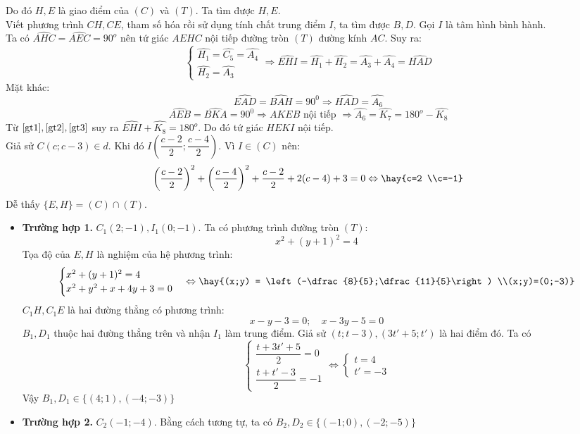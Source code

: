 Do đó $H,E$ là giao điểm của $(C)$ và $(T)$. Ta tìm được $H,E$.\\
Viết phương trình $CH, CE$, tham số hóa rồi sử dụng tính chất trung điểm $I$, ta tìm được $B,D$.
\lgi
Gọi $I$ là tâm hình bình hành. \\
Ta có $\widehat{AHC}=\widehat{AEC}=90^o$ nên tứ giác $AEHC$ nội tiếp đường tròn $(T)$ đường kính $AC$. Suy ra:
\begin{equation} \label{gt1}
 \begin{cases} \widehat{H_1} = \widehat{C_5}= \widehat{A_4} \\ \widehat{H_2}=\widehat{A_3}  \end{cases} \Rightarrow \widehat{EHI} = \widehat{H_1}+\widehat{H_2} = \widehat{A_3}+\widehat{A_4} =\widehat{HAD}
\end{equation}
Mặt khác:
\begin{equation} \label{gt2}
\widehat{EAD} = \widehat{BAH} = 90^0  \Rightarrow \widehat{HAD} = \widehat{A_6}
\end{equation}
\begin{equation} \label{gt3}
\widehat{AEB} = \widehat{BKA} = 90^0  \Rightarrow AKEB \text{ nội tiếp } \Rightarrow \widehat{A_6}=\widehat{K_7} = 180^o-\widehat{K_8}
\end{equation}
Từ $\eqref{gt1}, \eqref{gt2}, \eqref{gt3}$ suy ra $\widehat{EHI}+\widehat{K_8}=180^o$. Do đó tứ giác $HEKI$ nội tiếp.\\
Giả sử $C(c;c-3) \in d$. Khi đó $I\left(\dfrac{c-2}{2};\dfrac{c-4}{2}\right)$. Vì $I \in (C)$ nên:
$$\left(\dfrac{c-2}{2}\right)^2+ \left(\dfrac{c-4}{2}\right)^2+\dfrac{c-2}{2}+2(c-4)+3=0 \Leftrightarrow \hay{c=2 \\c=-1}$$
Dễ thấy $\{ E, H \} = (C) \cap (T)$.
\begin{itemize}
\item \textbf{Trường hợp 1.} $C_1(2;-1), I_1(0;-1)$. Ta có phương trình đường tròn $(T):$
$$x^2+(y+1)^2 = 4$$
Tọa độ của $E,H$ là nghiệm của hệ phương trình:
$$\begin{cases}x^2+(y+1)^2 = 4 \\  x^2+y^2+x+4y+3=0 \end{cases} \Leftrightarrow \hay{(x;y) = \left(-\dfrac{8}{5};\dfrac{11}{5}\right) \\(x;y)=(0;-3)}$$
$C_1H, C_1E$ là hai đường thẳng có phương trình:
$$x-y-3=0; \quad  x-3y-5=0$$
$B_1,D_1$ thuộc hai đường thẳng trên và nhận $I_1$ làm trung điểm. Giả sử $(t;t-3),(3t'+5;t')$ là hai điểm đó. Ta có
$$\begin{cases}\dfrac{t+3t'+5}{2}= 0 \\ \dfrac{t+t'-3}{2} = -1\end{cases} \Leftrightarrow \begin{cases}t=4\\t'=-3\end{cases}$$
Vậy $B_1,D_1 \in \{ (4;1), (-4;-3) \}$
\item \textbf{Trường hợp 2.} $C_2(-1;-4)$. Bằng cách tương tự, ta có $B_2,D_2 \in \{(-1;0), (-2;-5) \}$
\end{itemize}
